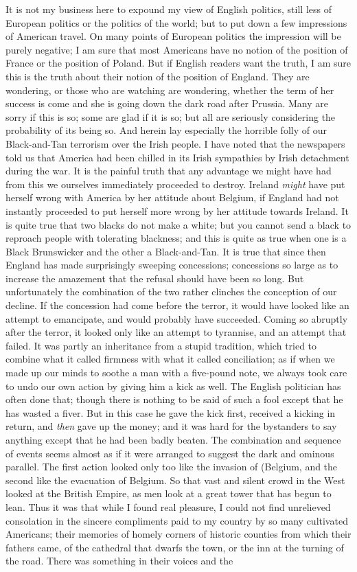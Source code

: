 \documentclass{book}
\begin{document}
It is not my business here to expound my view of English politics, still less of European politics or the politics of the world; but to put down a few impressions of American travel. On many points of European politics the impression will be purely negative; I am sure that most Americans have no notion of the position of France or the position of Poland. But if English readers want the truth, I am sure this is the truth about their notion of the position of England. They are wondering, or those who are watching are wondering, whether the term of her success is come and she is going down the dark road after Prussia. Many are sorry if this is so; some are glad if it is so; but all are seriously considering the probability of its being so. And herein lay especially the horrible folly of our Black-and-Tan terrorism over the Irish people. I have noted that the newspapers told us that America had been chilled in its Irish sympathies by Irish detachment during the war. It is the painful truth that any advantage we might have had from this we ourselves immediately proceeded to destroy. Ireland \emph{might} have put herself wrong with America by her attitude about Belgium, if England had not instantly proceeded to put herself more wrong by her attitude towards Ireland. It is quite true that two blacks do not make a white; but you cannot send a black to reproach people with tolerating blackness; and this is quite as true when one is a Black Brunswicker and the other a Black-and-Tan. It is true that since then England has made surprisingly sweeping concessions; concessions so large as to increase the amazement that the refusal should have been so long. But unfortunately the combination of the two rather clinches the conception of our decline. If the concession had come before the terror, it would have looked like an attempt to emancipate, and would probably have succeeded. Coming so abruptly after the terror, it looked only like an attempt to tyrannise, and an attempt that failed. It was partly an inheritance from a stupid tradition, which tried to combine what it called firmness with what it called conciliation; as if when we made up our minds to soothe a man with a five-pound note, we always took care to undo our own action by giving him a kick as well. The English politician has often done that; though there is nothing to be said of such a fool except that he has wasted a fiver. But in this case he gave the kick first, received a kicking in return, and \emph{then} gave up the money; and it was hard for the bystanders to say anything except that he had been badly beaten. The combination and sequence of events seems almost as if it were arranged to suggest the dark and ominous parallel. The first action looked only too like the invasion of (Belgium, and the second like the evacuation of Belgium. So that vast and silent crowd in the West looked at the British Empire, as men look at a great tower that has begun to lean. Thus it was that while I found real pleasure, I could not find unrelieved consolation in the sincere compliments paid to my country by so many cultivated Americans; their memories of homely corners of historic counties from which their fathers came, of the cathedral that dwarfs the town, or the inn at the turning of the road. There was something in their voices and the 
\end{document}
